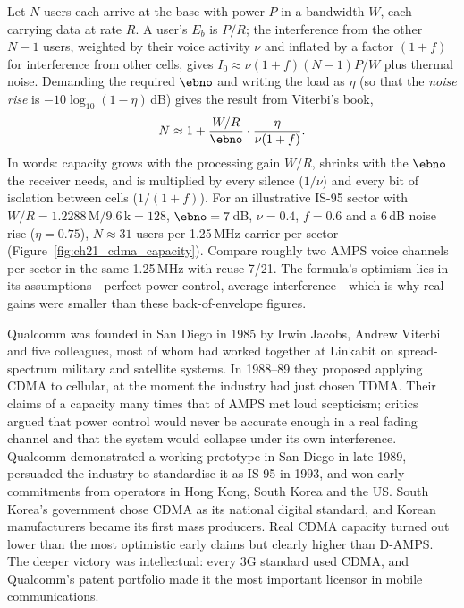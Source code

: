 \begin{deeper}
Let $N$ users each arrive at the base with power $P$ in a bandwidth $W$, each carrying data at rate
$R$. A user's $E_b$ is $P/R$; the interference from the other $N-1$ users, weighted by their voice
activity $\nu$ and inflated by a factor $(1+f)$ for interference from other cells, gives
$I_0\approx\nu(1+f)(N-1)P/W$ plus thermal noise. Demanding the required $\ebno$ and writing the load
as $\eta$ (so that the \emph{noise rise} is $-10\log_{10}(1-\eta)$\,dB) gives the result from
Viterbi's book,
\[
N\approx1+\frac{W/R}{\ebno}\cdot\frac{\eta}{\nu(1+f)}.
\]
In words: capacity grows with the processing gain $W/R$, shrinks with the $\ebno$ the receiver
needs, and is multiplied by every silence ($1/\nu$) and every bit of isolation between cells
($1/(1+f)$). For an illustrative IS-95 sector with $W/R=1.2288\,\mathrm{M}/9.6\,\mathrm{k}=128$,
$\ebno=7$\,dB, $\nu=0.4$, $f=0.6$ and a 6\,dB noise rise ($\eta=0.75$), $N\approx31$ users per
1.25\,MHz carrier per sector (Figure~\ref{fig:ch21_cdma_capacity}). Compare roughly two AMPS voice channels per sector in the same
1.25\,MHz with reuse-7/21. The formula's optimism lies in its assumptions---perfect power control,
average interference---which is why real gains were smaller than these back-of-envelope figures.
\end{deeper}

\begin{history}
Qualcomm was founded in San Diego in 1985 by Irwin Jacobs, Andrew Viterbi and five colleagues, most
of whom had worked together at Linkabit on spread-spectrum military and satellite systems. In
1988--89 they proposed applying CDMA to cellular, at the moment the industry had just chosen TDMA.
Their claims of a capacity many times that of AMPS met loud scepticism; critics argued that power
control would never be accurate enough in a real fading channel and that the system would collapse
under its own interference. Qualcomm demonstrated a working prototype in San Diego in late 1989,
persuaded the industry to standardise it as IS-95 in 1993, and won early commitments from operators
in Hong Kong, South Korea and the US. South Korea's government chose CDMA as its national digital
standard, and Korean manufacturers became its first mass producers. Real CDMA capacity turned out
lower than the most optimistic early claims but clearly higher than D-AMPS. The deeper victory was
intellectual: every 3G standard used CDMA, and Qualcomm's patent portfolio made it the most
important licensor in mobile communications.
\end{history}

